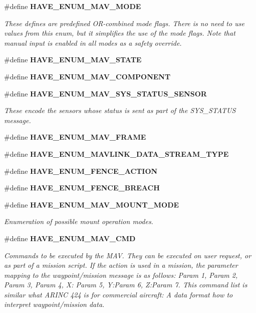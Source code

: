 \begin{DoxyCompactItemize}
\#define \textbf{ H\+A\+V\+E\+\_\+\+E\+N\+U\+M\+\_\+\+M\+A\+V\+\_\+\+M\+O\+DE}
\begin{DoxyCompactList}\small\item\em These defines are predefined O\+R-\/combined mode flags. There is no need to use values from this enum, but it simplifies the use of the mode flags. Note that manual input is enabled in all modes as a safety override. \end{DoxyCompactList}\item 
\#define \textbf{ H\+A\+V\+E\+\_\+\+E\+N\+U\+M\+\_\+\+M\+A\+V\+\_\+\+S\+T\+A\+TE}
\item 
\#define \textbf{ H\+A\+V\+E\+\_\+\+E\+N\+U\+M\+\_\+\+M\+A\+V\+\_\+\+C\+O\+M\+P\+O\+N\+E\+NT}
\item 
\#define \textbf{ H\+A\+V\+E\+\_\+\+E\+N\+U\+M\+\_\+\+M\+A\+V\+\_\+\+S\+Y\+S\+\_\+\+S\+T\+A\+T\+U\+S\+\_\+\+S\+E\+N\+S\+OR}
\begin{DoxyCompactList}\small\item\em These encode the sensors whose status is sent as part of the S\+Y\+S\+\_\+\+S\+T\+A\+T\+US message. \end{DoxyCompactList}\item 
\#define \textbf{ H\+A\+V\+E\+\_\+\+E\+N\+U\+M\+\_\+\+M\+A\+V\+\_\+\+F\+R\+A\+ME}
\item 
\#define \textbf{ H\+A\+V\+E\+\_\+\+E\+N\+U\+M\+\_\+\+M\+A\+V\+L\+I\+N\+K\+\_\+\+D\+A\+T\+A\+\_\+\+S\+T\+R\+E\+A\+M\+\_\+\+T\+Y\+PE}
\item 
\#define \textbf{ H\+A\+V\+E\+\_\+\+E\+N\+U\+M\+\_\+\+F\+E\+N\+C\+E\+\_\+\+A\+C\+T\+I\+ON}
\item 
\#define \textbf{ H\+A\+V\+E\+\_\+\+E\+N\+U\+M\+\_\+\+F\+E\+N\+C\+E\+\_\+\+B\+R\+E\+A\+CH}
\item 
\#define \textbf{ H\+A\+V\+E\+\_\+\+E\+N\+U\+M\+\_\+\+M\+A\+V\+\_\+\+M\+O\+U\+N\+T\+\_\+\+M\+O\+DE}
\begin{DoxyCompactList}\small\item\em Enumeration of possible mount operation modes. \end{DoxyCompactList}\item 
\#define \textbf{ H\+A\+V\+E\+\_\+\+E\+N\+U\+M\+\_\+\+M\+A\+V\+\_\+\+C\+MD}
\begin{DoxyCompactList}\small\item\em Commands to be executed by the M\+AV. They can be executed on user request, or as part of a mission script. If the action is used in a mission, the parameter mapping to the waypoint/mission message is as follows\+: Param 1, Param 2, Param 3, Param 4, X\+: Param 5, Y\+:Param 6, Z\+:Param 7. This command list is similar what A\+R\+I\+NC 424 is for commercial aircraft\+: A data format how to interpret waypoint/mission data. \end{DoxyCompactList}\item 

\end{DoxyCompactItemize}
